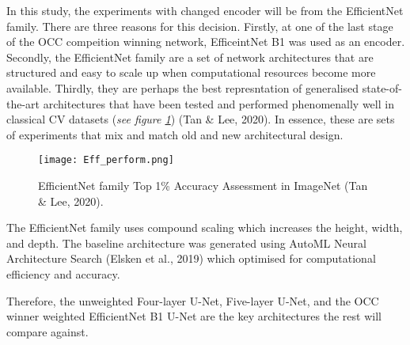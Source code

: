 \documentclass[11pt, a4paper, twoside]{report}
\begin{document}
In this study, the experiments with changed encoder will be from the EfficientNet family. There are three reasons for this decision. Firstly, at one of the last stage of the OCC compeition winning network, EfficeintNet B1 was used as an encoder. Secondly, the EfficientNet family are a set of network architectures that are structured and easy to scale up when computational resources become more available. Thirdly, they are perhaps the best represntation of generalised state-of-the-art architectures that have been tested and performed phenomenally well in classical CV datasets (\textit{see figure \ref{fig:Eff_perform}}) (Tan \& Lee, 2020). In essence, these are sets of experiments that mix and match old and new architectural design.\\\par

\begin{figure}[H]
  \centering
  \texttt{[image: Eff\_perform.png]}
  \caption{EfficientNet family Top 1\% Accuracy Assessment in ImageNet (Tan \& Lee, 2020).}
  \label{fig:Eff_perform}
\end{figure}

The EfficientNet family uses compound scaling which increases the height, width, and depth. The baseline architecture was generated using AutoML Neural Architecture Search (Elsken et al., 2019) which optimised for computational efficiency and accuracy.

Therefore, the unweighted Four-layer U-Net, Five-layer U-Net, and the OCC winner weighted EfficientNet B1 U-Net are the key architectures the rest will compare against.

\begin{table}[H]
  \centering
\end{table}
\end{document}
